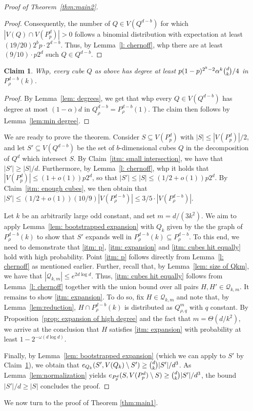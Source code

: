 \documentclass{article}
\newtheorem{claim}[thm]{Claim}
\theoremstyle{definition}
\newcommand{\eps}{\varepsilon}
\newcommand{\cQ}{\mathcal{Q}}
\begin{document}
\begin{proof}[Proof of Theorem~\ref{thm:main2}]
\begin{proof}
Consequently, the number of $Q\in V(Q^{d-b})$ for which $|V(Q)\cap V(P^d_p)|>0$ follows a binomial distribution with expectation at least $(19/20)2^bp\cdot 2^{d-b}$. Thus, by Lemma~\ref{l: chernoff}, whp there are at least $(9/10)\cdot p2^{d}$ such $Q\in Q^{d-b}$.
\end{proof}
\begin{claim}\label{itm: high enough degree} 
Whp, every cube $Q$ as above has degree at least $p(1-p)^{2^k-2} \alpha^k \tbinom{d}{k}/4$ in $P^{d-b}_{\rho}(k)$.
\end{claim}
\begin{proof}
    By Lemma~\ref{lem: degrees}, we get that whp every $Q\in V(Q^{d-b})$ has degree at most $(1-\alpha)d$ in $Q^{d-b}_{\rho}=P^{d-b}_{\rho}(1)$. The claim then follows by Lemma~\ref{lem:min degree}.
\end{proof}
We are ready to prove the theorem.
Consider $S\subseteq V(P^{d}_p)$ with $|S|\leq |V(P^d_p)|/2$, and let $S'\subseteq V(Q^{d-b})$ be the set of $b$-dimensional cubes $Q$ in the decomposition of $Q^d$ which intersect $S$. 
By Claim~\ref{itm: small intersection}, we have that $|S'|\geq |S|/d$. Furthermore, by Lemma~\ref{l: chernoff}, whp it holds that $|V(P^d_p)|\leq (1+o(1))p2^d$, so that $|S'|\leq |S|\leq (1/2 + o(1))p2^d$. 
By Claim~\ref{itm: enough cubes}, we then obtain that $|S'|\leq (1/2+o(1))(10/9) |V(P^{d-b}_\rho)|\le 3/5\cdot |V(P^{d-b}_\rho)|$.
   
Let $k$ be an arbitrarily large odd constant, and set $m=d/(3k^2)$. We aim to apply Lemma~\ref{lem: bootstrapped expansion} with $Q_k$ given by the the graph of $P^{d-b}_{\rho}(k)$ to show that $S'$ expands well in $P^{d-b}_{\rho}(k)\subseteq P^{d-b}_{\rho}$. 
To this end, we need to demonstrate that \ref{itm: p}, \ref{itm: expansion} and \ref{itm: cubes hit equally} hold with high probability. 
Point \ref{itm: p} follows directly from Lemma~\ref{l: chernoff} as mentioned earlier. 
Further, recall that, by Lemma~\ref{lem: size of Qkm}, we have that $|\cQ_{k,m}|\leq e^{2d\log d}$. Thus, \ref{itm: cubes hit equally} follows from Lemma~\ref{l: chernoff} together with the union bound over all pairs $H,H'\in\cQ_{k,m}$. It remains to show \ref{itm: expansion}. 
To do so, fix $H\in\cQ_{k,m}$ and note that, by Lemma~\ref{lem:reduction}, $H\cap P^{d-b}_{\rho}(k)$ is distributed as $Q^m_{\rho,q}$ with $q$ constant. 
By Proposition~\ref{prop: expansion of high degree} and the fact that $m=\Theta(d/k^2)$, we arrive at the conclusion that $H$ satisfies \ref{itm: expansion} with probability at least $1-2^{-\omega(d\log d)}$.

Finally, by Lemma~\ref{lem: bootstrapped expansion} (which we can apply to $S'$ by Claim~\ref{itm: high enough degree}), we obtain that $e_{Q_k}(S',V(Q_k)\setminus S')\geq \tbinom{d}{k}|S'|/d^3$.
As Lemma~\ref{lem:normalization} yields $e_{P^{d}_p}(S,V(P^{d}_p)\setminus S)\geq \tbinom{d}{k}|S'|/d^3$, the bound $|S'|/d\geq |S|$ concludes the proof.
\end{proof}
We now turn to the proof of Theorem \ref{thm:main1}.
\end{document}
